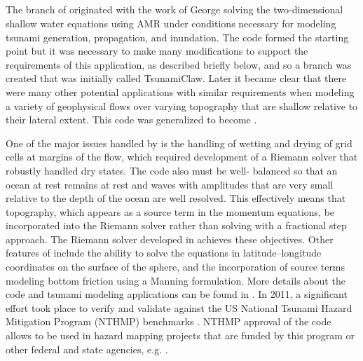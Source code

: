 %
%
%

\subsection{\geoclaw} 

The \geoclaw branch of \clawpack originated with the work of George
\cite{dgeorge:masters, dgeorge:phd, dgeorge:jcp} 
solving the
two-dimensional shallow water equations using AMR under
conditions necessary for modeling tsunami generation, propagation, and
inundation.
The \amrclaw code formed the starting point but it was necessary to make many 
modifications to support the requirements of this application, as described
briefly below, and so a branch was created that was initially called
{\sc TsunamiClaw}.  Later it became clear that there were many other potential
applications with similar requirements when modeling a variety of
geophysical flows over varying topography that are shallow 
relative to their lateral extent.  This code was generalized to
become \geoclaw.

One of the major issues handled by \geoclaw is the handling of wetting and
drying of grid cells at margins of the flow, which required development of a
Riemann solver that robustly handled dry states.  The code also must be well-
balanced so that an ocean at rest remains at rest and waves with amplitudes that
are very small relative to the depth of the ocean are well resolved.  This
effectively means that topography, which appears as a source term in the
momentum equations, be incorporated into the Riemann solver rather than solving
with a fractional step approach.  The Riemann solver developed in
\cite{dgeorge:phd, dgeorge:jcp} achieves these objectives. Other features of
\geoclaw include the ability to solve the equations in latitude--longitude
coordinates on the surface of the sphere, and the incorporation of source terms
modeling bottom friction using a Manning formulation. More details about the
code and tsunami modeling applications can be found in
\cite{BergerGeorgeLeVequeMandli:awr11, LeVequeGeorgeBerger:an11}. In 2011, a
significant effort took place to verify and validate \geoclaw against the US
National Tsunami Hazard Mitigation Program (NTHMP) benchmarks
\cite{GonzalezLeVequeEtAl2011}.
NTHMP approval of the code allows \geoclaw to be used in hazard mapping 
projects that are funded by this program or other federal and state agencies,
e.g.
\cite{GonzalezLeVequeEtAl2013a,GonzalezLeVequeEtAl2014}.

